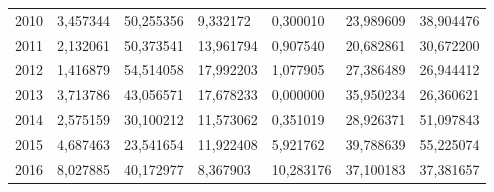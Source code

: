 \begin{table}
\begin{tabular}{p{1cm}p{2cm}p{2cm}p{2cm}p{2cm}p{2cm}p{2cm}}
 2010 &                               3,457344 &            50,255356 &             9,332172 &  0,300010 &                                          23,989609 &                  38,904476 \\
 2011 &                               2,132061 &            50,373541 &            13,961794 &  0,907540 &                                          20,682861 &                  30,672200 \\
 2012 &                               1,416879 &            54,514058 &            17,992203 &  1,077905 &                                          27,386489 &                  26,944412 \\
 2013 &                               3,713786 &            43,056571 &            17,678233 &  0,000000 &                                          35,950234 &                  26,360621 \\
 2014 &                               2,575159 &            30,100212 &            11,573062 &  0,351019 &                                          28,926371 &                  51,097843 \\
 2015 &                               4,687463 &            23,541654 &            11,922408 &  5,921762 &                                          39,788639 &                  55,225074 \\
 2016 &                               8,027885 &            40,172977 &             8,367903 & 10,283176 &                                          37,100183 &                  37,381657 \\
\bottomrule
\end{tabular}
\end{table}
